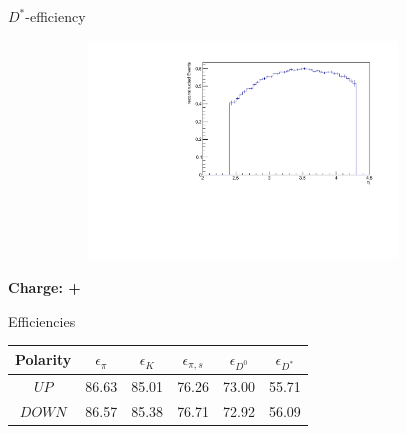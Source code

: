 \documentclass[11pt]{beamer}
\begin{document}
\begin{frame}{$D^*$-efficiency}
\begin{figure}
\begin{subfigure}{0.45\textwidth}
\end{subfigure}
\begin{subfigure}{0.45\textwidth}
\includegraphics[width=0.9\textwidth]{up_pdf/tot/h_eta_reco_Dst.pdf}
\end{subfigure}
\end{figure}
\end{frame}
\begin{frame}
\begin{LARGE}
\textbf{Charge: +}
\end{LARGE}
\end{frame}
\begin{frame}{Efficiencies}
\begin{table}
	\begin{tabular}{cS[table-format=2.4]S[table-format=2.4]S[table-format=2.4]S[table-format=2.4]S[table-format=2.4]}
		\toprule
		{Polarity} & {$\epsilon_{\pi} $} & {$\epsilon_{K} $} & {$ \epsilon_{\pi,s} $} & {$\epsilon_{D^0} $} & {$\epsilon_{D^*} $} \\
		\midrule
		$UP$ & 86.63  & 85.01  & 76.26  & 73.00  & 55.71  \\
		$DOWN$ & 86.57   & 85.38  & 76.71  & 72.92  & 56.09  \\
		\bottomrule
	\end{tabular}
\end{table}
\end{frame}
\end{document}
